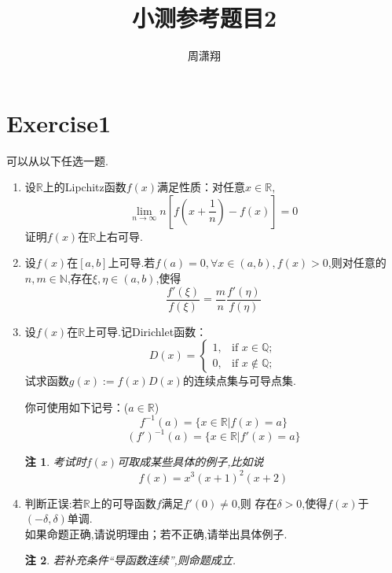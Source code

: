 \documentclass{ctexart}
\newtheorem{re}{注}
\begin{document}

\title{小测参考题目2} %

\author{周潇翔} %



	\maketitle %
	

	

	\section{Exercise1} 
可以从以下任选一题.
\begin{enumerate}
	\item 设$\mathbb{R}$上的Lipchitz函数$f(x)$满足性质：对任意$x \in \mathbb{R}$,
	$$\lim\limits_{n \rightarrow \infty}n[f(x+\frac{1}{n})-f(x)]=0$$
	证明$f(x)$在$\mathbb{R}$上右可导.
\item 设$f(x)$在$[a,b]$上可导.若$f(a)=0,\forall x \in (a,b), f(x)>0$,则对任意的$n,m \in \mathbb{N}$,存在$\xi,\eta \in (a,b)$,使得
$$\frac{f'(\xi)}{f(\xi)}=\frac{m}{n}\frac{f'(\eta)}{f(\eta)}$$
\item 设$f(x)$在$\mathbb{R}$上可导.记Dirichlet函数：
\begin{equation*}\label{eq:dirichlet}
	D(x)=
	\begin{cases}
	1, & \text{if } x \in \mathbb{Q}; \\
	0, & \text{if } x \notin \mathbb{Q};
	\end{cases}
\end{equation*}
试求函数$g(x):=f(x)D(x)$的连续点集与可导点集.

你可使用如下记号：($a \in \mathbb{R}$)
$$f^{-1}(a)=\{x \in \mathbb{R}|f(x)=a\}$$
$$(f')^{-1}(a)=\{x \in \mathbb{R}|f'(x)=a\}$$
\begin{re}
	考试时$f(x)$可取成某些具体的例子,比如说
	$$f(x)=x^3(x+1)^2(x+2)$$
\end{re}
\item 判断正误:若$\mathbb{R}$上的可导函数$f$满足$f'(0)\neq 0$,则
存在$\delta>0$,使得$f(x)$于$(-\delta,\delta)$单调.\\
如果命题正确,请说明理由；若不正确,请举出具体例子.
\begin{re}
	若补充条件“导函数连续”,则命题成立.
\end{re}
\end{enumerate}
\end{document}
